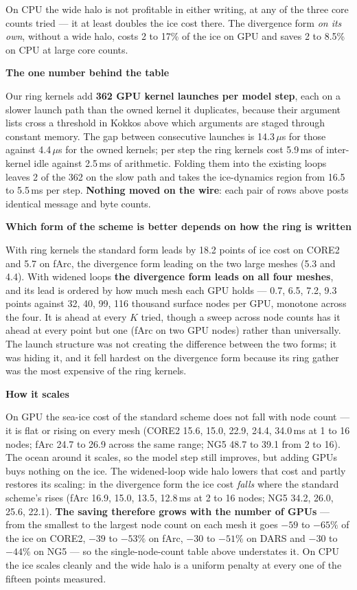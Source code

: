 \documentclass[10pt,a4paper]{article}
\newcommand{\hd}[1]{\vspace{0.2em}\textbf{\large #1}\par\vspace{0.05em}}
\begin{document}
On CPU the wide halo is not profitable in either writing, at any of the three core counts
tried --- it at least doubles the ice cost there. The divergence form \emph{on its own}, without a
wide halo, costs 2 to 17\% of the ice on GPU and saves 2 to 8.5\% on CPU at large core counts.

\hd{The one number behind the table}

Our ring kernels add \textbf{362 GPU kernel launches per model step}, each on a slower launch path
than the owned kernel it duplicates, because their argument lists cross a threshold in Kokkos above
which arguments are staged through constant memory. The gap between consecutive launches is
14.3\,$\mu$s for those against 4.4\,$\mu$s for the owned kernels; per step the ring kernels cost
5.9\,ms of inter-kernel idle against 2.5\,ms of arithmetic. Folding them into the existing loops
leaves 2 of the 362 on the slow path and takes the ice-dynamics region from 16.5 to 5.5\,ms per
step. \textbf{Nothing moved on the wire}: each pair of rows above posts identical message and byte
counts.

\hd{Which form of the scheme is better depends on how the ring is written}

With ring kernels the standard form leads by 18.2 points of ice cost on CORE2 and 5.7 on fArc,
the divergence form leading on the two large meshes (5.3 and 4.4). With widened loops \textbf{the
divergence form leads on
all four meshes}, and its lead is ordered by how much mesh each GPU holds --- 0.7, 6.5, 7.2, 9.3
points against 32, 40, 99, 116 thousand surface nodes per GPU, monotone across the four. It is
ahead at every $K$ tried, though a sweep across node counts has it ahead at every point but one
(fArc on two GPU nodes) rather than universally. The
launch structure was not creating the difference between the two forms; it was hiding it, and it
fell hardest on the divergence form because its ring gather was the most expensive of the ring
kernels.

\hd{How it scales}

On GPU the sea-ice cost of the standard scheme does not fall with node count --- it is flat or
rising on every mesh (CORE2 15.6, 15.0, 22.9, 24.4, 34.0\,ms at 1 to 16 nodes; fArc 24.7 to 26.9
across the same range; NG5 48.7 to 39.1 from 2 to 16). The ocean around it scales, so the model step
still improves, but adding GPUs buys nothing on the ice. The widened-loop wide halo lowers that cost
and partly restores its scaling: in the divergence form the ice cost \emph{falls} where the standard
scheme's rises (fArc 16.9, 15.0, 13.5, 12.8\,ms at 2 to 16 nodes; NG5 34.2, 26.0, 25.6, 22.1).
\textbf{The saving therefore grows with the number of GPUs} --- from the smallest to the largest
node count on each mesh it goes $-59$ to $-65\%$ of the ice on CORE2, $-39$ to $-53\%$ on fArc,
$-30$ to $-51\%$ on DARS and $-30$ to $-44\%$ on NG5 --- so the single-node-count table above
understates it. On CPU the ice scales cleanly and the wide halo is a uniform penalty at every one
of the fifteen points measured.
\end{document}
